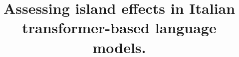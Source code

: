 \documentclass[10pt,a4paper]{article}
\begin{document}
\title{Assessing island effects in Italian transformer-based language models.}
\end{document}
